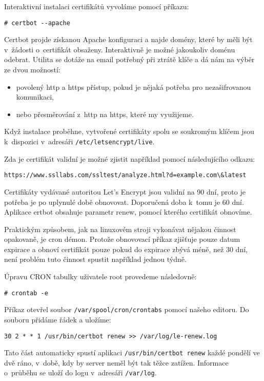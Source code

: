 Interaktivní instalaci certifikátů vyvoláme pomocí příkazu:

\begin{verbatim}
# certbot --apache
\end{verbatim}


Certbot projde získanou Apache konfiguraci a najde domény, které by měli být v~žádosti o~certifikát obsaženy. Interaktivně je možné jakoukoliv doménu odebrat. Utilita se dotáže na email potřebný při ztrátě klíče a dá nám na výběr ze dvou možností:

\begin{itemize}
\item povolený http a https přístup, pokud je nějaká potřeba pro nezašifrovanou komunikaci,
\item nebo přesměrování z~http na https, které my využijeme.
\end{itemize}

Když instalace proběhne, vytvořené certifikáty spolu se soukromým klíčem jsou k~dispozici v~adresáři \texttt{/etc/letsencrypt/live}.

Zda je certifikát validní je možné zjistit například pomocí následujícího odkazu:

\begin{verbatim}
https://www.ssllabs.com/ssltest/analyze.html?d=example.com\&latest
\end{verbatim}

Certifikáty vydávané autoritou Let's Encrypt jsou validní na 90 dní, proto je potřeba je po uplynulé době obnovovat. Doporučená doba k~tomu je 60 dní. Aplikace ertbot obsahuje parametr renew, pomocí kterého certifikát obnovíme.

Praktickým způsobem, jak na linuxovém stroji vykonávat nějakou činnost opakovaně, je cron démon. Protože obnovovací příkaz zjišťuje pouze datum expirace a obnoví certifikát pouze pokud do expirace zbývá méně, než 30 dní, není problém tuto činnost spustit například jednou týdně.

Úpravu CRON tabulky uživatele root provedeme následovně:

\begin{verbatim}
# crontab -e
\end{verbatim}

Příkaz otevřel soubor \texttt{/var/spool/cron/crontabs} pomocí našeho editoru. Do souboru přidáme řádek a uložíme:

\begin{verbatim}
30 2 * * 1 /usr/bin/certbot renew >> /var/log/le-renew.log
\end{verbatim}

Tato část automaticky spustí aplikaci \texttt{/usr/bin/certbot renew} každé pondělí ve dvě ráno, v~době, kdy by server neměl být tak těžce zatížen. Informace o~průběhu se uloží do logu v~adresáři \texttt{/var/log}.
